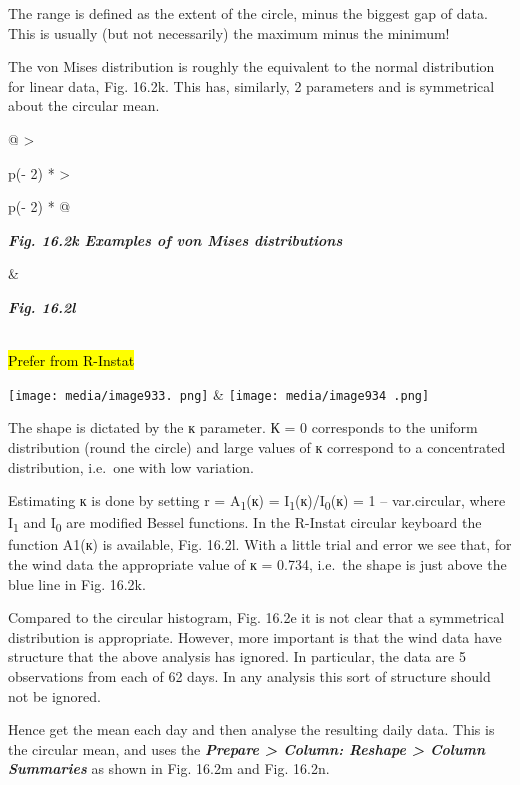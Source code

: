 \documentclass[
  letterpaper,
  DIV=11,
  numbers=noendperiod]{scrreprt}
\begin{document}
The range is defined as the extent of the circle, minus the biggest gap
of data. This is usually (but not necessarily) the maximum minus the
minimum!

The von Mises distribution is roughly the equivalent to the normal
distribution for linear data, Fig. 16.2k. This has, similarly, 2
parameters and is symmetrical about the circular mean.

\begin{longtable}[]{@{}
  >{\raggedright\arraybackslash}p{(\columnwidth - 2\tabcolsep) * }
  >{\raggedright\arraybackslash}p{(\columnwidth - 2\tabcolsep) * }@{}}
\toprule\noalign{}
\begin{minipage}[b]{\linewidth}\raggedright
\textbf{\emph{Fig. 16.2k Examples of von Mises distributions}}
\end{minipage} & \begin{minipage}[b]{\linewidth}\raggedright
\textbf{\emph{Fig. 16.2l}}
\end{minipage} \\
\midrule\noalign{}
\endhead
\bottomrule\noalign{}
\endlastfoot
\hl{Prefer from R-Instat}

\texttt{[image: media/image933. png]}
&
\texttt{[image: media/image934 .png]} \\
\end{longtable}

The shape is dictated by the к parameter. К = 0 corresponds to the
uniform distribution (round the circle) and large values of к correspond
to a concentrated distribution, i.e.~one with low variation.

Estimating к is done by setting r = A\textsubscript{1}(к) =
I\textsubscript{1}(к)/I\textsubscript{0}(к) = 1 -- var.circular, where
I\textsubscript{1} and I\textsubscript{0} are modified Bessel functions.
In the R-Instat circular keyboard the function A1(к) is available, Fig.
16.2l. With a little trial and error we see that, for the wind data the
appropriate value of к = 0.734, i.e.~the shape is just above the blue
line in Fig. 16.2k.

Compared to the circular histogram, Fig. 16.2e it is not clear that a
symmetrical distribution is appropriate. However, more important is that
the wind data have structure that the above analysis has ignored. In
particular, the data are 5 observations from each of 62 days. In any
analysis this sort of structure should not be ignored.

Hence get the mean each day and then analyse the resulting daily data.
This is the circular mean, and uses the \textbf{\emph{Prepare
\textgreater{} Column: Reshape \textgreater{} Column Summaries}} as
shown in Fig. 16.2m and Fig. 16.2n.
\end{document}
